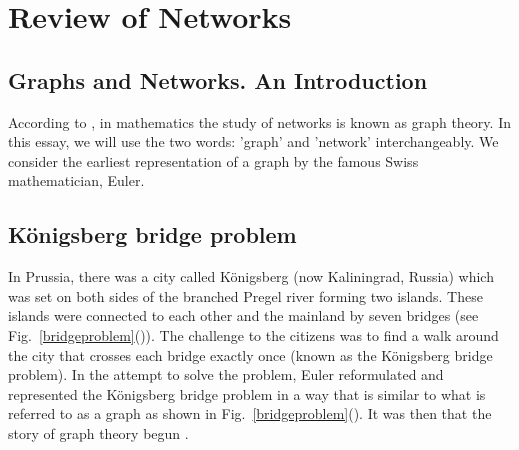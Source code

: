 \documentclass[10pt,a4paper]{article}
\begin{document}
	\newpage
	\section{Review of Networks}
	
\subsection{Graphs and Networks. An Introduction}

According to \cite{estrada2011structure}, in mathematics the study of networks is known as graph theory. In this essay, we will use the two words: 'graph' and 'network' interchangeably. We consider the earliest representation of a graph by the famous Swiss mathematician, Euler.

\subsection{K\"{o}nigsberg bridge problem}
In Prussia, there was a city called  K\"{o}nigsberg (now Kaliningrad, Russia) which was set on both sides of the branched Pregel river forming two islands. These islands were connected to each other and the mainland by seven bridges (see Fig.~\ref{bridgeproblem}()). The challenge to the citizens was to find a walk around the city that crosses each bridge exactly once (known as the K\"{o}nigsberg bridge problem). In the attempt to solve the problem, Euler reformulated and represented the K\"{o}nigsberg bridge problem in a way that is similar to what is referred to as a graph as shown in Fig.~\ref{bridgeproblem}(). It was then that the story of graph theory begun \citep{estrada2011structure}.
\end{document}
